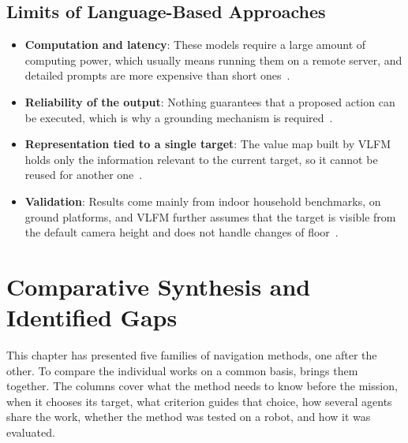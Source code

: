 \subsection{Limits of Language-Based Approaches}%
\label{subsec:nav:genai-limits}

\begin{itemize}[itemsep=0.5em]
    \item \textbf{Computation and latency}: These models require a large amount
          of computing power, which usually means running them on a remote
          server, and detailed prompts are more expensive than short
          ones~\cite{chen2024typefly}.
    \item \textbf{Reliability of the output}: Nothing guarantees that a proposed
          action can be executed, which is why a grounding mechanism is
          required~\cite{ahn2022saycan}.
    \item \textbf{Representation tied to a single target}: The value map built by
          VLFM holds only the information relevant to the current target, so it
          cannot be reused for another one~\cite{yokoyama2024vlfm}.
    \item \textbf{Validation}: Results come mainly from indoor household
          benchmarks, on ground platforms, and VLFM further assumes that the
          target is visible from the default camera height and does not handle
          changes of floor~\cite{yokoyama2024vlfm, yu2023l3mvn}.
\end{itemize}
\section{Comparative Synthesis and Identified Gaps}%
\label{sec:nav:synthesis}

This chapter has presented five families of navigation methods, one after the
other. To compare the individual works on a common basis,
 brings them together. The columns cover what the method
needs to know before the mission, when it chooses its target, what criterion
guides that choice, how several agents share the work, whether the method was
tested on a robot, and how it was evaluated.

